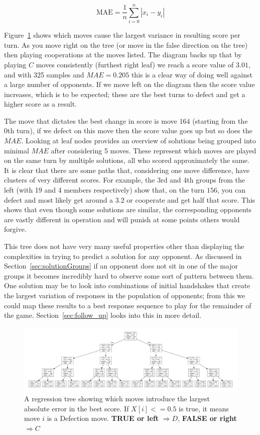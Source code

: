 $$\text{MAE} = \frac{1}{n}\sum_{i=0}^n |x_i-y_i|$$

Figure~\ref{fig:reg_tree} shows which moves cause the largest variance in resulting score per turn.
As you move right on the tree (or move in the false direction on the tree) then playing cooperations at the moves listed. 
The diagram backs up that by playing $C$ moves consistently (furthest right leaf) we reach a score value of $3.01$, and with 325 samples and $MAE=0.205$ this is a clear way of doing well against a large number of opponents.
If we move left on the diagram then the score value increases, which is to be expected; these are the best turns to defect and get a higher score as a result.

The move that dictates the best change in score is move $164$ (starting from the 0th turn), if we defect on this move then the score value goes up but so does the $MAE$.
Looking at leaf nodes provides an overview of solutions being grouped into minimal $MAE$ after considering 5 moves.
These represent which moves are played on the same turn by multiple solutions, all who scored approximately the same.
It is clear that there are some paths that, considering one move difference, have clusters of very different scores. 
For example, the 3rd and 4th groups from the left (with 19 and 4 members respectively) show that, on the turn $156$, you can defect and most likely get around a $3.2$ or cooperate and get half that score.
This shows that even though some solutions are similar, the corresponding opponents are vastly different in operation and will punish at some points others would forgive.

This tree does not have very many useful properties other than displaying the complexities in trying to predict a solution for any opponent.
As discussed in Section~\ref{sec:solutionGroups} if an opponent does not sit in one of the major groups it becomes incredibly hard to observe some sort of pattern between them.
One solution may be to look into combinations of initial handshakes that create the largest variation of responses in the population of opponents; from this we could map these results to a best response sequence to play for the remainder of the game.
Section~\ref{sec:follow_up} looks into this in more detail.

\begin{figure}
    \includegraphics[width=1.0\textwidth, center]{./img/descriptive/reg_tree.pdf}
    \centering
    \caption{A regression tree showing which moves introduce the largest absolute error in the best score. If $X[i]<=0.5$ is true, it means move $i$ is a Defection move.
    \textbf{TRUE or left} $\Rightarrow D$, \textbf{FALSE or right} $\Rightarrow C$}
    \label{fig:reg_tree}
\end{figure}


